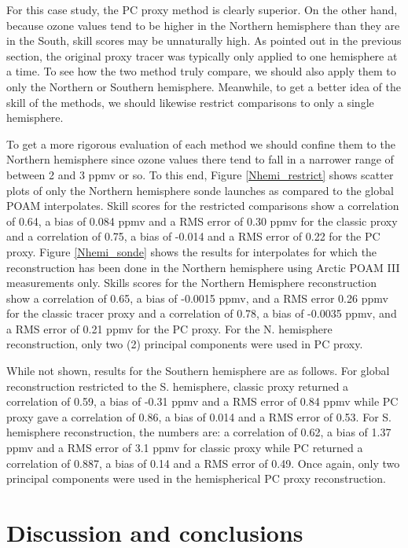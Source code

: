 \documentclass{article}
\begin{document}
For this case study, the PC proxy method is clearly superior. On the other
hand, because ozone values tend to be higher in the Northern hemisphere than
they are in the South, skill scores may be unnaturally high.
As pointed out in the previous section, the original proxy tracer was 
typically only applied to one hemisphere at a time.
To see how the two method truly compare, we should also apply them to only the
Northern or Southern hemisphere.
Meanwhile, to get a better idea of the skill of the methods, we should likewise
restrict comparisons to only a single hemisphere.

To get a more rigorous evaluation of each method we should confine them
to the Northern hemisphere
since ozone values there tend to fall in a narrower range of 
between 2 and 3 ppmv or so.
To this end, Figure \ref{Nhemi_restrict} shows scatter plots of only the
Northern hemisphere sonde launches as compared to the global POAM interpolates.
Skill scores for the restricted comparisons show a correlation of 0.64,
a bias of 0.084 ppmv and a RMS error of 0.30 ppmv for the classic proxy
and a correlation of 0.75, a bias of -0.014 and a RMS error of 0.22 for
the PC proxy.
Figure \ref{Nhemi_sonde} shows the results for interpolates for which the
reconstruction has been done in the Northern hemisphere using 
Arctic POAM III measurements only.
Skills scores for the Northern Hemisphere reconstruction show a correlation
of 0.65, a bias of -0.0015 ppmv, and a RMS error 0.26 ppmv for the classic
tracer proxy and a correlation of 0.78, a bias of -0.0035 ppmv,
and a RMS error of 0.21 ppmv for the PC proxy.
For the N. hemisphere reconstruction, only two (2) principal components were
used in PC proxy.

While not shown, results for the Southern hemisphere are as follows.
For global reconstruction restricted to the S. hemisphere, classic proxy
returned a correlation of 0.59, a bias of -0.31 ppmv and a RMS error 
of 0.84 ppmv while PC proxy gave a correlation of 0.86, a bias of 0.014
and a RMS error of 0.53.
For S. hemisphere reconstruction, the numbers are: a correlation of 0.62,
a bias of 1.37 ppmv and a RMS error of 3.1 ppmv for classic proxy
while PC returned a correlation of 0.887, a bias of 0.14 and a RMS error
of 0.49.
Once again, only two principal components were used in the hemispherical PC
proxy reconstruction.

\section{Discussion and conclusions}
\end{document}
